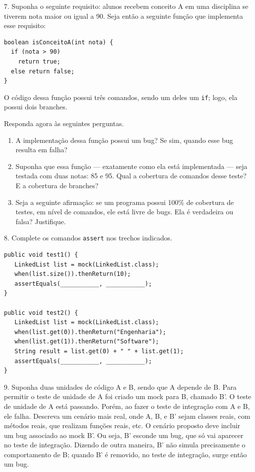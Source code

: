 \documentclass[
  11pt,
  twoside]{book}
\newcommand{\passthrough}[1]{#1}
\begin{document}
7. Suponha o seguinte requisito: alunos recebem conceito A em uma
disciplina se tiverem nota maior ou igual a 90. Seja então a seguinte
função que implementa esse requisito:

\begin{lstlisting}
boolean isConceitoA(int nota) {
  if (nota > 90)
    return true;
  else return false;
}
\end{lstlisting}

O código dessa função possui três comandos, sendo um deles um
\passthrough{\lstinline!if!}; logo, ela possui dois branches.

Responda agora às seguintes perguntas.

\begin{enumerate}
\def\labelenumi{(\alph{enumi})}
\item
  A implementação dessa função possui um bug? Se sim, quando esse bug
  resulta em falha?
\item
  Suponha que essa função --- exatamente como ela está implementada ---
  seja testada com duas notas: 85 e 95. Qual a cobertura de comandos
  desse teste? E a cobertura de branches?
\item
  Seja a seguinte afirmação: se um programa possui 100\% de cobertura de
  testes, em nível de comandos, ele está livre de bugs. Ela é verdadeira
  ou falsa? Justifique.
\end{enumerate}

8. Complete os comandos \passthrough{\lstinline!assert!} nos trechos
indicados.

\begin{lstlisting}
public void test1() {
   LinkedList list = mock(LinkedList.class);
   when(list.size()).thenReturn(10);
   assertEquals(___________, ___________);
}

public void test2() {
   LinkedList list = mock(LinkedList.class);
   when(list.get(0)).thenReturn("Engenharia");
   when(list.get(1)).thenReturn("Software");
   String result = list.get(0) + " " + list.get(1);
   assertEquals(___________, ___________);
}
\end{lstlisting}

9. Suponha duas unidades de código A e B, sendo que A depende de B. Para
permitir o teste de unidade de A foi criado um mock para B, chamado B'.
O teste de unidade de A está passando. Porém, ao fazer o teste de
integração com A e B, ele falha. Descreva um cenário mais real, onde A,
B, e B' sejam classes reais, com métodos reais, que realizam funções
reais, etc. O cenário proposto deve incluir um bug associado ao mock B'.
Ou seja, B' esconde um bug, que só vai aparecer no teste de integração.
Dizendo de outra maneira, B' não simula precisamente o comportamento de
B; quando B' é removido, no teste de integração, surge então um bug.
\end{document}
